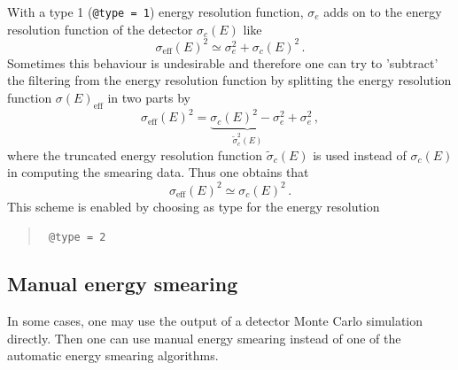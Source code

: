 With a type 1 ({\tt @type = 1}) energy resolution 
function, $\sigma_e$ adds on to the energy resolution function 
of the detector $\sigma_c(E)$ like
\begin{equation}
\sigma_{\mathrm{eff}}(E)^2\simeq \sigma_e^2 + \sigma_c(E)^2\,.
\end{equation} 
Sometimes this behaviour is undesirable and therefore one can try to 
'subtract' the filtering from the energy resolution function by splitting 
the energy resolution function $\sigma(E)_{\mathrm{eff}}$ in
two parts by
\begin{equation}
\sigma_{\mathrm{eff}}(E)^2=\underbrace{\sigma_c(E)^2-\sigma_e^2}_
{\tilde\sigma^2_c(E)}+\sigma_e^2\,,
\end{equation}
where the truncated energy resolution function $\tilde\sigma_c(E)$ 
is used instead of $\sigma_c(E)$ in computing the
smearing data. Thus one obtains that
\begin{equation}
\sigma_{\mathrm{eff}}(E)^2\simeq \sigma_c(E)^2\,.
\end{equation} 
This scheme is enabled by choosing as type for the energy resolution
\begin{quote}
{\tt
@type = 2
}
\end{quote}

\subsection{Manual energy smearing}

In some cases, one may use the output of a detector Monte Carlo simulation
directly. Then one can use manual energy smearing instead of one of the
automatic energy smearing algorithms. 


